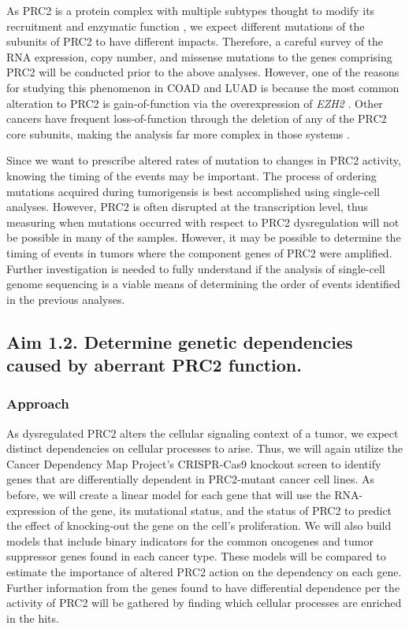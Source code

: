As PRC2 is a protein complex with multiple subtypes thought to modify its recruitment and enzymatic function \cite{Wassef2017, Holoch2017, Kasinath2018, Laugesen2019a}, we expect different mutations of the subunits of PRC2 to have different impacts.
Therefore, a careful survey of the RNA expression, copy number, and missense mutations to the genes comprising PRC2 will be conducted prior to the above analyses.
However, one of the reasons for studying this phenomenon in COAD and LUAD is because the most common alteration to PRC2 is gain-of-function via the overexpression of \emph{EZH2} \cite{Comet2016MaintainingCancer.}.
Other cancers have frequent loss-of-function through the deletion of any of the PRC2 core subunits, making the analysis far more complex in those systems \cite{Comet2016MaintainingCancer.}.

Since we want to prescribe altered rates of mutation to changes in PRC2 activity, knowing the timing of the events may be important.
The process of ordering mutations acquired during tumorigensis is best accomplished using single-cell analyses.
However, PRC2 is often disrupted at the transcription level, thus measuring when mutations occurred with respect to PRC2 dysregulation will not be possible in many of the samples.
However, it may be possible to determine the timing of events in tumors where the component genes of PRC2 were amplified.
Further investigation is needed to fully understand if the analysis of single-cell genome sequencing is a viable means of determining the order of events identified in the previous analyses.




\subsection*{Aim 1.2. Determine genetic dependencies caused by aberrant PRC2 function.}


\subsubsection*{Approach}

As dysregulated PRC2 alters the cellular signaling context of a tumor, we expect distinct dependencies on cellular processes to arise.
Thus, we will again utilize the Cancer Dependency Map Project's CRISPR-Cas9 knockout screen to identify genes that are differentially dependent in PRC2-mutant cancer cell lines.
As before, we will create a linear model for each gene that will use the RNA-expression of the gene, its mutational status, and the status of PRC2 to predict the effect of knocking-out the gene on the cell's proliferation.
We will also build models that include binary indicators for the common oncogenes and tumor suppressor genes found in each cancer type.
These models will be compared to estimate the importance of altered PRC2 action on the dependency on each gene.
Further information from the genes found to have differential dependence per the activity of PRC2 will be gathered by finding which cellular processes are enriched in the hits.

